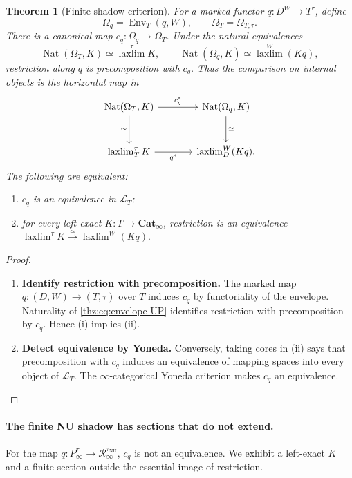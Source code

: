 \documentclass[oneside]{article}
\theoremstyle{plain}
\newtheorem{theorem}{Theorem}[section]
\theoremstyle{definition}
\theoremstyle{remark}
\newcommand{\Cat}{\mathbf{Cat}_{\infty}}
\newcommand{\Env}{\operatorname{Env}}
\newcommand{\NU}{\mathrm{NU}}
\newcommand{\Nat}{\operatorname{Nat}}
\newcommand{\RNU}{\mathcal R_{\infty}}
\newcommand{\laxlim}{\mathop{\mathrm{laxlim}}}
\begin{document}
\begin{theorem}[Finite-shadow criterion]\label{thz:thm:shadow}
For a marked functor $q:D^W\to T^\tau$, define
\[
 \Omega_q=\Env_T(q,W),
 \qquad
 \Omega_T=\Omega_{T,\tau}.
\]
There is a canonical map
$c_q:\Omega_q\to\Omega_T$.  Under the natural equivalences
\[
 \Nat(\Omega_T,K)\simeq\operatorname*{laxlim}^{\tau}K,
 \qquad
 \Nat(\Omega_q,K)\simeq
 \operatorname*{laxlim}^{W}(Kq),
\]
restriction along $q$ is precomposition with $c_q$.
Thus the comparison on internal objects is the horizontal map in
\[
\begin{tikzcd}[column sep=large,row sep=large]
 \Nat(\Omega_T,K)\ar[r,"c_q^*"]\ar[d,"\simeq"']&
 \Nat(\Omega_q,K)\ar[d,"\simeq"]\\
 \laxlim_T^\tau K\ar[r,"q^*"']&\laxlim_D^W(Kq).
\end{tikzcd}
\]
  The following are
equivalent:
\begin{enumerate}\renewcommand{\labelenumi}{(\roman{enumi})}
\item $c_q$ is an equivalence in $\mathcal L_T$;
\item for every left exact $K:T\to\Cat$, restriction is an equivalence $\operatorname*{laxlim}^{\tau}K \xrightarrow{\simeq} \operatorname*{laxlim}^{W}(Kq).$ \end{enumerate}
\end{theorem}
\begin{proof}
\leavevmode
\begin{enumerate}
\item \textbf{Identify restriction with precomposition.} The marked map $q:(D,W)\to(T,\tau)$ over $T$ induces $c_q$ by
functoriality of the envelope.  Naturality of
\eqref{thz:eq:envelope-UP} identifies restriction with precomposition by
$c_q$.  Hence (i) implies (ii).
\item \textbf{Detect equivalence by Yoneda.} Conversely, taking cores in (ii) says
that precomposition with $c_q$ induces an equivalence of mapping spaces
into every object of $\mathcal L_T$.  The $\infty$-categorical Yoneda
criterion makes $c_q$ an equivalence.\qedhere
\end{enumerate}
\end{proof}

\paragraph{The finite NU shadow has sections that do not extend.}
For the map $q:P_\infty^\tau\to\RNU^{\tau_{\NU}}$,
$c_q$ is not an equivalence. We exhibit a left-exact $K$ and a finite
section outside the essential image of restriction.
\end{document}
